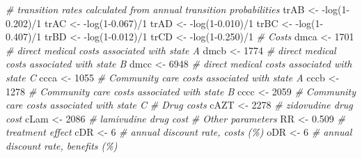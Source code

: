\documentclass[
]{article}
\newenvironment{Shaded}{\begin{snugshade}}{\end{snugshade}}
\newcommand{\CommentTok}[1]{\textcolor[rgb]{0.56,0.35,0.01}{\textit{#1}}}
\newcommand{\DecValTok}[1]{\textcolor[rgb]{0.00,0.00,0.81}{#1}}
\newcommand{\FloatTok}[1]{\textcolor[rgb]{0.00,0.00,0.81}{#1}}
\newcommand{\FunctionTok}[1]{\textcolor[rgb]{0.00,0.00,0.00}{#1}}
\newcommand{\NormalTok}[1]{#1}
\newcommand{\OtherTok}[1]{\textcolor[rgb]{0.56,0.35,0.01}{#1}}
\newcommand{\SpecialCharTok}[1]{\textcolor[rgb]{0.00,0.00,0.00}{#1}}
\begin{document}
\begin{Shaded}
\begin{Highlighting}[]
\CommentTok{\# transition rates calculated from annual transition probabilities}
\NormalTok{trAB }\OtherTok{\textless{}{-}} \SpecialCharTok{{-}}\FunctionTok{log}\NormalTok{(}\DecValTok{1}\FloatTok{{-}0.202}\NormalTok{)}\SpecialCharTok{/}\DecValTok{1} 
\NormalTok{trAC }\OtherTok{\textless{}{-}} \SpecialCharTok{{-}}\FunctionTok{log}\NormalTok{(}\DecValTok{1}\FloatTok{{-}0.067}\NormalTok{)}\SpecialCharTok{/}\DecValTok{1}
\NormalTok{trAD }\OtherTok{\textless{}{-}} \SpecialCharTok{{-}}\FunctionTok{log}\NormalTok{(}\DecValTok{1}\FloatTok{{-}0.010}\NormalTok{)}\SpecialCharTok{/}\DecValTok{1}
\NormalTok{trBC }\OtherTok{\textless{}{-}} \SpecialCharTok{{-}}\FunctionTok{log}\NormalTok{(}\DecValTok{1}\FloatTok{{-}0.407}\NormalTok{)}\SpecialCharTok{/}\DecValTok{1}
\NormalTok{trBD }\OtherTok{\textless{}{-}} \SpecialCharTok{{-}}\FunctionTok{log}\NormalTok{(}\DecValTok{1}\FloatTok{{-}0.012}\NormalTok{)}\SpecialCharTok{/}\DecValTok{1}
\NormalTok{trCD }\OtherTok{\textless{}{-}} \SpecialCharTok{{-}}\FunctionTok{log}\NormalTok{(}\DecValTok{1}\FloatTok{{-}0.250}\NormalTok{)}\SpecialCharTok{/}\DecValTok{1}
\CommentTok{\# Costs}
\NormalTok{dmca }\OtherTok{\textless{}{-}} \DecValTok{1701} \CommentTok{\# direct medical costs associated with state A}
\NormalTok{dmcb }\OtherTok{\textless{}{-}} \DecValTok{1774} \CommentTok{\# direct medical costs associated with state B}
\NormalTok{dmcc }\OtherTok{\textless{}{-}} \DecValTok{6948} \CommentTok{\# direct medical costs associated with state C}
\NormalTok{ccca }\OtherTok{\textless{}{-}} \DecValTok{1055} \CommentTok{\# Community care costs associated with state A}
\NormalTok{cccb }\OtherTok{\textless{}{-}} \DecValTok{1278} \CommentTok{\# Community care costs associated with state B}
\NormalTok{cccc }\OtherTok{\textless{}{-}} \DecValTok{2059} \CommentTok{\# Community care costs associated with state C}
\CommentTok{\# Drug costs}
\NormalTok{cAZT }\OtherTok{\textless{}{-}} \DecValTok{2278} \CommentTok{\# zidovudine drug cost}
\NormalTok{cLam }\OtherTok{\textless{}{-}} \DecValTok{2086} \CommentTok{\# lamivudine drug cost}
\CommentTok{\# Other parameters}
\NormalTok{RR }\OtherTok{\textless{}{-}} \FloatTok{0.509} \CommentTok{\# treatment effect}
\NormalTok{cDR }\OtherTok{\textless{}{-}} \DecValTok{6} \CommentTok{\# annual discount rate, costs (\%)}
\NormalTok{oDR }\OtherTok{\textless{}{-}} \DecValTok{6} \CommentTok{\# annual discount rate, benefits (\%)}
\end{Highlighting}
\end{Shaded}
\end{document}
